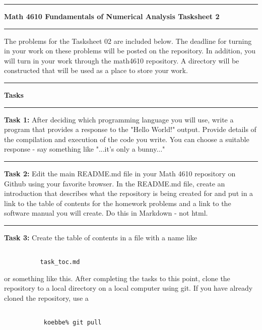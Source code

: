 \documentclass[10pt,fleqn]{article}
\begin{document}
\vskip0.1in\hrule\vskip0.1in \noindent
{\bf{\Large Math 4610 Fundamentals of Numerical Analysis Tasksheet 2}}
\vskip0.1in\hrule\vskip0.1in \noindent
The problems for the Tasksheet 02 are included below. The deadline for turning
in your work on these problems will be posted on the repository. In addition,
you will turn in your work through the math4610 repository. A directory will be
constructed that will be used as a place to store your work.
\vskip0.1in\hrule\vskip0.1in \noindent
{\bf{\large Tasks}}
\vskip0.1in\hrule\vskip0.1in \noindent
\begin{trivlist}
  \item[\bf Task 1:] After deciding which programming language you will use,
        write a program that provides a response to the "Hello World!" output.
        Provide details of the compilation and execution of the code you write.
        You can choose a suitable response - say something like "...it's only a
        bunny..."
\vskip0.1in\hrule\vskip0.1in \noindent
  \item[\bf Task 2:] Edit the main README.md file in your Math 4610 repository
        on Github using your favorite browser. In the README.md file, create an
        introduction that describes what the repository is being created for and
        put in a link to the table of contents for the homework problems and a
        link to the software manual you will create. Do this in Markdown - not
        html.
\vskip0.1in\hrule\vskip0.1in \noindent
  \item[\bf Task 3:] Create the table of contents in a file with a name like
        \begin{verbatim}

          task_toc.md

        \end{verbatim}
        or something like this. After completing the tasks to this point, clone
        the repository to a local directory on a local computer using git. If
        you have already cloned the repository, use a
        \begin{verbatim}

           koebbe% git pull


\end{verbatim}
\end{trivlist}
\end{document}
